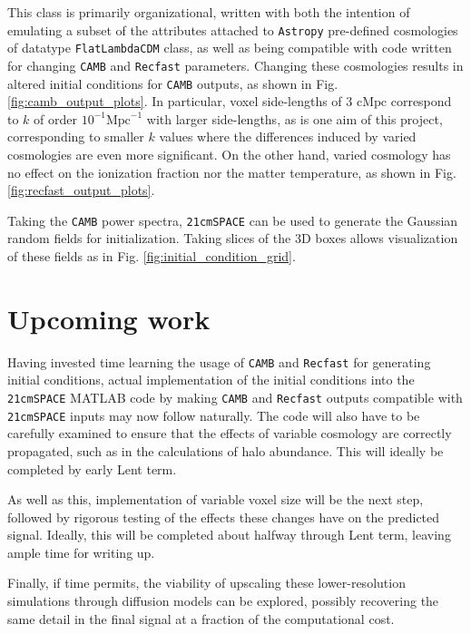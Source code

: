 \documentclass[floats,floatfix,showpacs,amssymb,prd,superscriptaddress,nofootinbib]{revtex4-2} %
\newcommand{\code}{\texttt}
\begin{document}
This class is primarily organizational, written with both the intention of emulating a subset of the attributes attached to \code{Astropy} pre-defined cosmologies of datatype \code{FlatLambdaCDM} class, as well as being compatible with code written for changing \code{CAMB} and \code{Recfast} parameters. Changing these cosmologies results in altered initial conditions for \code{CAMB} outputs, as shown in Fig. \ref{fig:camb_output_plots}. In particular, voxel side-lengths of $3 \text{ cMpc}$ correspond to $k$ of order $10^{-1} \text{Mpc}^{-1}$ with larger side-lengths, as is one aim of this project, corresponding to smaller $k$ values where the differences induced by varied cosmologies are even more significant. On the other hand, varied cosmology has no effect on the ionization fraction nor the matter temperature, as shown in Fig. \ref{fig:recfast_output_plots}. 

Taking the \code{CAMB} power spectra, \code{21cmSPACE} can be used to generate the Gaussian random fields for initialization. Taking slices of the 3D boxes allows visualization of these fields as in Fig. \ref{fig:initial_condition_grid}.

\section{Upcoming work}

Having invested time learning the usage of \code{CAMB} and \code{Recfast} for generating initial conditions, actual implementation of the initial conditions into the \code{21cmSPACE} MATLAB code by making \code{CAMB} and \code{Recfast} outputs compatible with \code{21cmSPACE} inputs may now follow naturally. The code will also have to be carefully examined to ensure that the effects of variable cosmology are correctly propagated, such as in the calculations of halo abundance. This will ideally be completed by early Lent term.

As well as this, implementation of variable voxel size will be the next step, followed by rigorous testing of the effects these changes have on the predicted signal. Ideally, this will be completed about halfway through Lent term, leaving ample time for writing up.

Finally, if time permits, the viability of upscaling these lower-resolution simulations through diffusion models can be explored, possibly recovering the same detail in the final signal at a fraction of the computational cost.
\end{document}

